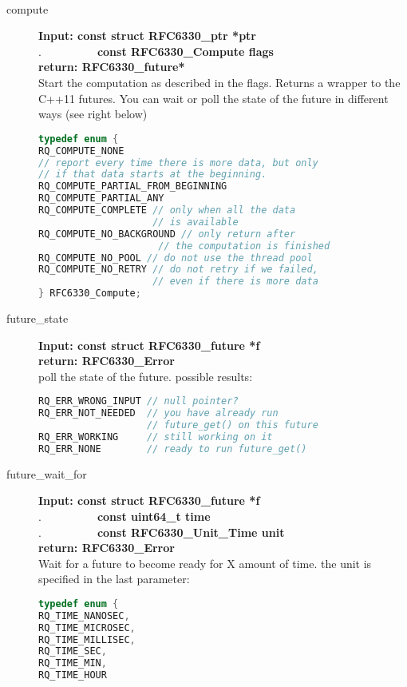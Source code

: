 \documentclass[11pt,a4paper]{refart}
\begin{document}
\newpage
{}\label{computation}\\
\begin{description}
\item[compute] \textbf{Input: const struct RFC6330\_ptr *ptr}\\
.\ \ \ \ \ \ \ \ \ \ \textbf{const RFC6330\_Compute flags}\\
\textbf{return: RFC6330\_future*}\\
Start the computation as described in the flags. Returns a wrapper to the C++11 futures. You can wait or poll the state of the future in different ways (see right below)\\
\begin{lstlisting}[language=C]
typedef enum {
RQ_COMPUTE_NONE 
// report every time there is more data, but only
// if that data starts at the beginning.
RQ_COMPUTE_PARTIAL_FROM_BEGINNING
RQ_COMPUTE_PARTIAL_ANY
RQ_COMPUTE_COMPLETE // only when all the data
					// is available
RQ_COMPUTE_NO_BACKGROUND // only return after
					 // the computation is finished
RQ_COMPUTE_NO_POOL // do not use the thread pool
RQ_COMPUTE_NO_RETRY // do not retry if we failed,
					// even if there is more data
} RFC6330_Compute;
\end{lstlisting}
\item[future\_state] \textbf{Input: const struct RFC6330\_future *f}\\
\textbf{return: RFC6330\_Error}\\
poll the state of the future. possible results:
\begin{lstlisting}[language=C]
RQ_ERR_WRONG_INPUT // null pointer?
RQ_ERR_NOT_NEEDED  // you have already run
				   // future_get() on this future
RQ_ERR_WORKING	   // still working on it
RQ_ERR_NONE		   // ready to run future_get()
\end{lstlisting}
\item[future\_wait\_for] \textbf{Input: const struct RFC6330\_future *f}\\
.\ \ \ \ \ \ \ \ \ \ \textbf{const uint64\_t time}\\
.\ \ \ \ \ \ \ \ \ \ \textbf{const RFC6330\_Unit\_Time unit}\\
\textbf{return: RFC6330\_Error}\\
Wait for a future to become ready for X amount of time. the unit is specified in the
last parameter:
\begin{lstlisting}[language=C]
typedef enum {
RQ_TIME_NANOSEC,
RQ_TIME_MICROSEC,
RQ_TIME_MILLISEC,
RQ_TIME_SEC,
RQ_TIME_MIN,
RQ_TIME_HOUR

\end{lstlisting}
\end{description}
\end{document}
